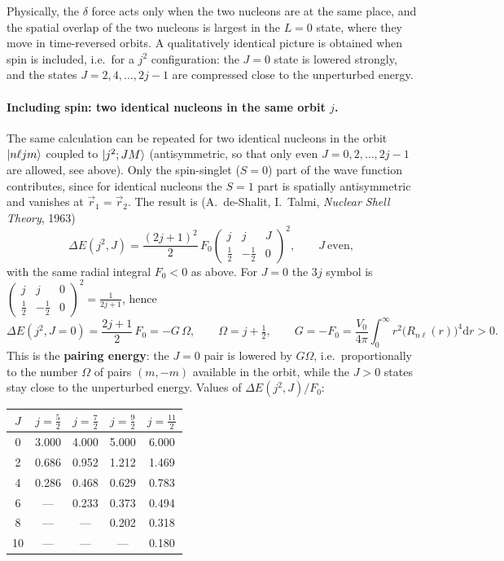 \documentclass[11pt,a4paper]{article}
\newcommand{\ud}{\mathrm{d}}
\begin{document}
Physically, the $\delta$ force acts only when the two nucleons are at the same place, and the spatial overlap of the two nucleons is largest in the $L=0$ state, where they move in time-reversed orbits. A qualitatively identical picture is obtained when spin is included, i.e.\ for a $j^2$ configuration: the $J=0$ state is lowered strongly, and the states $J=2,4,\dots,2j-1$ are compressed close to the unperturbed energy.


\paragraph{Including spin: two identical nucleons in the same orbit $j$.}
The same calculation can be repeated for two identical nucleons in the orbit $\ket{n\ell jm}$ coupled to $\ket{j^2;JM}$ (antisymmetric, so that only even $J=0,2,\dots,2j-1$ are allowed, see above). Only the spin-singlet ($S=0$) part of the wave function contributes, since for identical nucleons the $S=1$ part is spatially antisymmetric and vanishes at $\vec r_1=\vec r_2$. The result is (A.~de-Shalit, I.~Talmi, \emph{Nuclear Shell Theory}, 1963)
\[
\boxed{\Delta E(j^2,J)=\frac{(2j+1)^2}{2}\,F_0\begin{pmatrix}j&j&J\\\frac12&-\frac12&0\end{pmatrix}^2},\qquad J\ \text{even},
\]
with the same radial integral $F_0<0$ as above. For $J=0$ the 3$j$ symbol is $\begin{pmatrix}j&j&0\\\frac12&-\frac12&0\end{pmatrix}^2=\frac{1}{2j+1}$, hence
\[
\Delta E(j^2,J{=}0)=\frac{2j+1}{2}\,F_0=-G\,\Omega,\qquad \Omega=j+\tfrac12,\qquad G=-F_0=\frac{V_0}{4\pi}\int_0^\infty r^2\big(R_{n\ell}(r)\big)^4\ud r>0 .
\]
This is the \textbf{pairing energy}: the $J=0$ pair is lowered by $G\Omega$, i.e.\ proportionally to the number $\Omega$ of pairs $(m,-m)$ available in the orbit, while the $J>0$ states stay close to the unperturbed energy. Values of $\Delta E(j^2,J)/F_0$:
\begin{center}
\begin{tabular}{c c c c c}
$J$ & $j=\frac52$ & $j=\frac72$ & $j=\frac92$ & $j=\frac{11}{2}$\\ \hline
0 & 3.000 & 4.000 & 5.000 & 6.000\\
2 & 0.686 & 0.952 & 1.212 & 1.469\\
4 & 0.286 & 0.468 & 0.629 & 0.783\\
6 & --- & 0.233 & 0.373 & 0.494\\
8 & --- & --- & 0.202 & 0.318\\
10 & --- & --- & --- & 0.180
\end{tabular}
\end{center}
\end{document}
